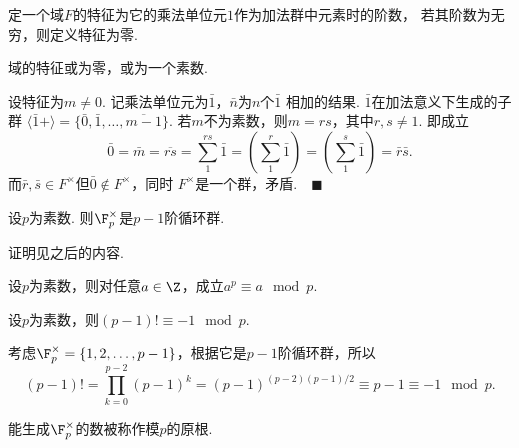   \begin{defi}
    定一个域$F$的特征为它的乘法单位元$1$作为加法群中元素时的阶数，
    若其阶数为无穷，则定义特征为零.
  \end{defi}

  \begin{lemma}
    域的特征或为零，或为一个素数.
  \end{lemma}
  \proof
    设特征为$m\ne 0$. 记乘法单位元为$\bar{1}$，$\bar{n}$为$n$个$\bar{1}$
    相加的结果. $\bar{1}$在加法意义下生成的子群
    $\langle\bar{1}+\rangle=\{\bar{0},\bar{1},\dots,\overline{m-1}\}$.
    若$m$不为素数，则$m=rs$，其中$r,s\ne 1$. 即成立
    \[
      \bar{0}=\bar{m}=\overline{rs}=\sum_1^{rs}\bar{1}
      =\left(\sum_1^r\bar{1}\right)=\left(\sum_1^s\bar{1}\right)
      =\bar{r}\bar{s}.
    \]
    而$\bar{r},\bar{s}\in F^\times$但$\bar{0} \notin F^\times$，同时
    $F^\times$是一个群，矛盾.$\quad\blacksquare$

  \begin{thm}[乘法群的结构]
    \label{thm: 乘法群的结构}
    设$p$为素数. 则$\F_p^\times$是$p-1$阶循环群.
  \end{thm}
  \remark
    证明见之后的内容.

  \begin{cor}[Fermat]
    设$p$为素数，则对任意$a\in\Z$，成立$a^p\equiv a\mod p$.
  \end{cor}

  \begin{cor}[Wilson]
    设$p$为素数，则$(p-1)!\equiv -1 \mod p$.
  \end{cor}
  \proof
    考虑$\F_p^\times=\{1,2,\dots,p-1\}$，根据它是$p-1$阶循环群，所以
    \[
      (p-1)! = \prod_{k=0}^{p-2}(p-1)^k = (p-1)^{(p-2)(p-1)/2}
      \equiv p-1 \equiv -1 \mod p.
    \]

  \begin{defi}[原根]
    能生成$\F_p^\times$的数被称作模$p$的原根.
  \end{defi}


